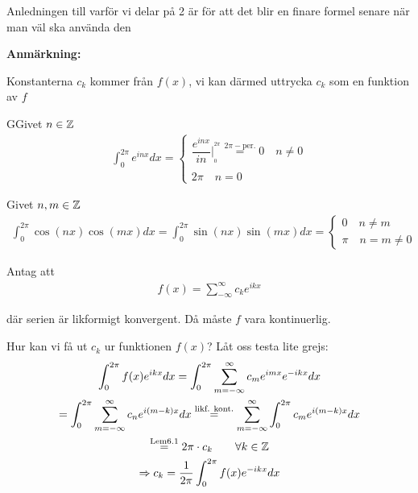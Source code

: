 \noindent Anledningen till varför vi delar på 2 är för att det blir en finare formel senare när man väl ska använda den
\par\bigskip
\noindent\textbf{Anmärkning:}\par
\noindent Konstanterna $c_k$ kommer från $f(x)$, vi kan därmed uttrycka $c_k$ som en funktion av $f$
\par\bigskip
\begin{lem}
  GGivet $n\in\mathbb{Z}$
  \begin{equation*}
    \begin{gathered}
      \int_{0}^{2\pi}e^{inx}dx = \begin{cases}\dfrac{e^{inx}}{in}|_{_0}^{^{2\pi}} \stackrel{2\pi-\text{per.}}{=} 0\quad n\neq0\\\\2\pi\quad n=0\end{cases}
    \end{gathered}
  \end{equation*}
  \par\bigskip
  \noindent Givet $n,m\in\mathbb{Z}$
  \begin{equation*}
    \begin{gathered}
      \int_{0}^{2\pi}\cos(nx)\cos(mx)dx = \int_{0}^{2\pi}\sin(nx)\sin(mx)dx = \begin{cases}0\quad n\neq m\\\pi\quad n=m\neq0\end{cases}
    \end{gathered}
  \end{equation*}
\end{lem}
\par\bigskip
\noindent Antag att
\begin{equation*}
  \begin{gathered}
    f(x) = \sum_{-\infty}^{\infty}c_ke^{ikx}
  \end{gathered}
\end{equation*}\par
\noindent där serien är likformigt konvergent. Då måste $f$ vara kontinuerlig.\par
\noindent Hur kan vi få ut $c_k$ ur funktionen $f(x)$? Låt oss testa lite grejs:
\begin{equation*}
  \begin{gathered}
    \int_{0}^{2\pi}f(x)e^{ikx} dx = \int_{0}^{2\pi}\sum_{m=-\infty}^{\infty}c_me^{imx}e^{-ikx}dx\\
    = \int_{0}^{2\pi}\sum_{m=-\infty}^{\infty}c_ne^{i(m-k)x}dx\stackrel{\text{likf. kont.}}{=} \sum_{m=-\infty}^{\infty}\int_{0}^{2\pi}c_me^{i(m-k)x}dx\\
    \stackrel{\text{Lem}6.1}{=} 2\pi\cdot c_k\qquad\forall k\in\mathbb{Z}\\
    \Rightarrow c_k = \dfrac{1}{2\pi}\int_{0}^{2\pi} f(x)e^{-ikx}dx
  \end{gathered}
\end{equation*}
